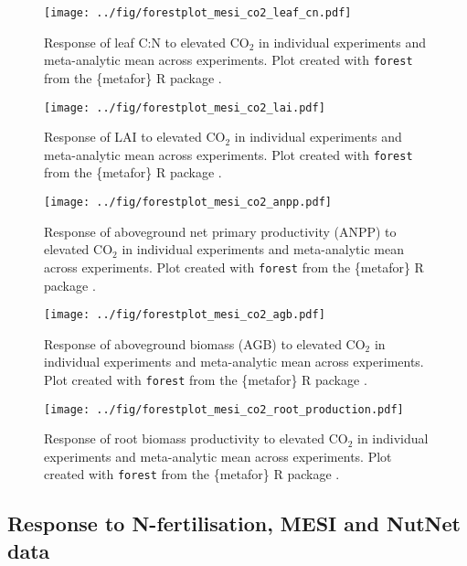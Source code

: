 \documentclass{myreport}
\begin{document}
\begin{figure}[h]
\centering
\texttt{[image: ../fig/forestplot\_mesi\_co2\_leaf\_cn.pdf]}
\caption{Response of leaf C:N to elevated CO$_2$ in individual experiments and meta-analytic mean across experiments. Plot created with \texttt{forest} from the \{metafor\} R package \cite{viechtbauer_conducting_2010}.}
\end{figure}

\begin{figure}[h]
\centering
\texttt{[image: ../fig/forestplot\_mesi\_co2\_lai.pdf]}
\caption{Response of LAI to elevated CO$_2$ in individual experiments and meta-analytic mean across experiments. Plot created with \texttt{forest} from the \{metafor\} R package \cite{viechtbauer_conducting_2010}.}
\end{figure}

\begin{figure}[h]
\centering
\texttt{[image: ../fig/forestplot\_mesi\_co2\_anpp.pdf]}
\caption{Response of aboveground net primary productivity (ANPP) to elevated CO$_2$ in individual experiments and meta-analytic mean across experiments. Plot created with \texttt{forest} from the \{metafor\} R package \cite{viechtbauer_conducting_2010}.}
\end{figure}

\begin{figure}[h]
\centering
\texttt{[image: ../fig/forestplot\_mesi\_co2\_agb.pdf]}
\caption{Response of aboveground biomass (AGB) to elevated CO$_2$ in individual experiments and meta-analytic mean across experiments. Plot created with \texttt{forest} from the \{metafor\} R package \cite{viechtbauer_conducting_2010}.}
\end{figure}

\begin{figure}[h]
\centering
\texttt{[image: ../fig/forestplot\_mesi\_co2\_root\_production.pdf]}
\caption{Response of root biomass productivity to elevated CO$_2$ in individual experiments and meta-analytic mean across experiments. Plot created with \texttt{forest} from the \{metafor\} R package \cite{viechtbauer_conducting_2010}.}
\end{figure}

\clearpage

\subsection{Response to N-fertilisation, MESI and NutNet data}
\end{document}
